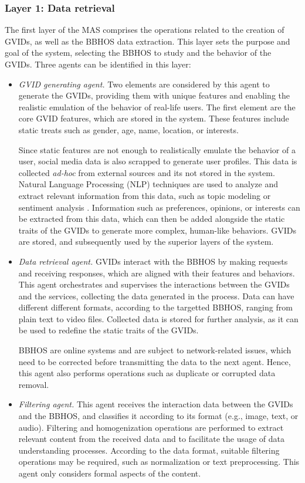\subsubsection*{Layer 1: Data retrieval}
The first layer of the MAS comprises the operations related to the creation of GVIDs, as well as the BBHOS data extraction. This layer sets the purpose and goal of the system, selecting the BBHOS to study and the behavior of the GVIDs. Three agents can be identified in this layer:
\begin{itemize}
    \item \textit{GVID generating agent.} Two elements are considered by this agent to generate the GVIDs, providing them with unique features and enabling the realistic emulation of the behavior of real-life users. The first element are the core GVID features, which are stored in the system. These features include static treats such as gender, age, name, location, or interests. 
    
    Since static features are not enough to realistically emulate the behavior of a user, social media data is also scrapped to generate user profiles. This data is collected \textit{ad-hoc} from external sources and its not stored in the system. Natural Language Processing (NLP) techniques are used to analyze and extract relevant information from this data, such as topic modeling \citep{Alghamdi2015} or sentiment analysis \citep{sentimentanalysis}. Information such as preferences, opinions, or interests can be extracted from this data, which can then be added alongside the static traits of the GVIDs to generate more complex, human-like behaviors. GVIDs are stored, and subsequently used by the superior layers of the system. 
    
    \item \textit{Data retrieval agent.} GVIDs interact with the BBHOS by making requests and receiving responses, which are aligned with their features and behaviors. This agent orchestrates and supervises the interactions between the GVIDs and the services, collecting the data generated in the process. Data can have different different formats, according to the targetted BBHOS, ranging from plain text to video files. Collected data is stored for further analysis, as it can be used to redefine the static traits of the GVIDs.
    
    BBHOS are online systems and are subject to network-related issues, which need to be corrected before transmitting the data to the next agent. Hence, this agent also performs operations such as duplicate or corrupted data removal. 
    
    \item \textit{Filtering agent.} This agent receives the interaction data between the GVIDs and the BBHOS, and classifies it according to its format (e.g., image, text, or audio). Filtering and homogenization operations are performed to extract relevant content from the received data and to facilitate the usage of data understanding processes. According to the data format, suitable filtering operations may be required, such as normalization or text preprocessing. This agent only considers formal aspects of the content.
\end{itemize}

